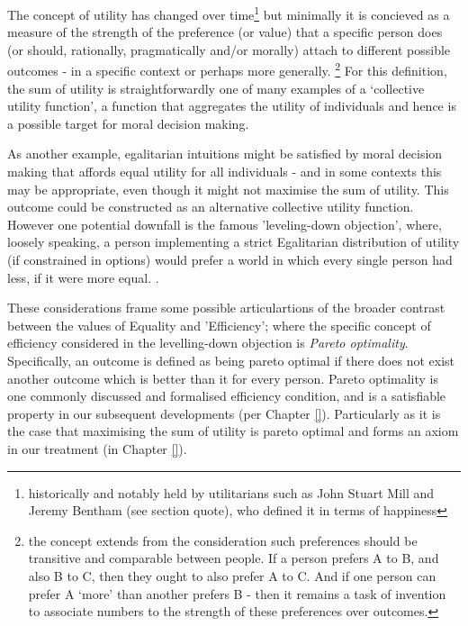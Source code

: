 The concept of utility has changed over time\footnote{historically and notably held by utilitarians such as John Stuart Mill\cite{MillGutenberg} and Jeremy Bentham (see section quote), who defined it in terms of happiness}
but minimally it is concieved as a measure of the strength of the preference (or value) that a specific person does (or should, rationally, pragmatically and/or morally) attach to different possible outcomes - in a specific context or perhaps more generally.
\footnote{the concept extends from the consideration such preferences should be transitive and comparable between people. If a person prefers A to B, and also B to C, then they ought to also prefer A to C. And if one person can prefer A `more' than another prefers B - then it remains a task of invention to associate numbers to the strength of these preferences over outcomes.}
For this definition, the sum of utility is straightforwardly one of many examples of a `collective utility function', a function that aggregates the utility of individuals and hence is a possible target for moral decision making.\cite{TheoriesofValueAggregation}

As another example, egalitarian intuitions might be satisfied by moral decision making that affords equal utility for all individuals - and in some contexts this may be appropriate, even though it might not maximise the sum of utility. This outcome could be constructed as an alternative collective utility function.
However one potential downfall is the famous 'leveling-down objection', where, loosely speaking, a person implementing a strict Egalitarian distribution of utility (if constrained in options) would prefer a world in which every single person had less, if it were more equal. \cite{temkin_2003, equalityandpriorityparfit}.

These considerations frame some possible articulartions of the broader contrast between the values of Equality and 'Efficiency'; where the specific concept of efficiency considered in the levelling-down objection is \textit{Pareto optimality}.
Specifically, an outcome is defined as being pareto optimal if there does not exist another outcome which is better than it for every person.
Pareto optimality is one commonly discussed and formalised efficiency condition, and is a satisfiable property in our subsequent developments (per Chapter \ref{}).
Particularly as it is the case that maximising the sum of utility is pareto optimal \cite{TheoriesofValueAggregation} and forms an axiom in our treatment (in Chapter \ref{}).

